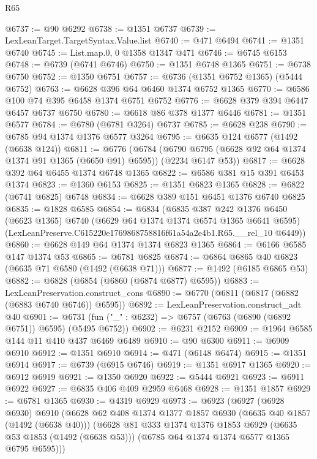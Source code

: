 \begin{lexlean}{R65}
\begin{coremodule}
@6737 := @90 @6292
@6738 := @1351 @6737
@6739 := LexLeanTarget.TargetSyntax.Value.list
@6740 := @471 @6494
@6741 := @1351 @6740
@6745 := List.map.{0, 0} @1358 @1347 @471
@6746 := @6745 @6153
@6748 := @6739 (@6741 @6746)
@6750 := @1351 @6748 @1365
@6751 := @6738 @6750
@6752 := @1350 @6751
@6757 := @6736 (@1351 @6752 @1365) (@5444 @6752)
@6763 := @6628 @396 @64 @6460 @1374 @6752 @1365
@6770 := @6586 @100 @74 @395 @6458 @1374 @6751 @6752
@6776 := @6628 @379 @394 @6447 @6457 @6737 @6750
@6780 := @6618 @86 @378 @1377 @6446
@6781 := @1351 @6577
@6784 := @6780 (@6781 @3264) @6737
@6785 := @6628 @238
@6790 := @6785 @94 @1374 @1376 @6577 @3264
@6795 := @6635 @124 @6577 (@1492 (@6638 @124))
@6811 := @6776
    (@6784 (@6790 @6795 (@6628 @92 @64 @1374 @1374 @91 @1365 (@6650 @91) @6595)) (@2234 @6147 @53))
@6817 := @6628 @392 @64 @6455 @1374 @6748 @1365
@6822 := @6586 @381 @15 @391 @6453 @1374
@6823 := @1360 @6153
@6825 := @1351 @6823 @1365
@6828 := @6822 (@6741 @6825) @6748
@6834 := @6628 @389 @151 @6451 @1376 @6740 @6825
@6835 := @1828 @6585
@6854 := @6834
    (@6835
      @387
      @242
      @1376
      @6450
      (@6623 @1365)
      @6740
      (@6629 @64 @1374 @1374 @6574 @1365 @6641 @6595)
      (LexLeanPreserve.C615220e1769868758816f61a54a2e4b1.R65.__rel_10 @6449))
@6860 := @6628 @149 @64 @1374 @1374 @6823 @1365
@6864 := @6166 @6585 @147 @1374 @53
@6865 := @6781 @6825
@6874 := @6864 @6865 @40 @6823 (@6635 @71 @6580 (@1492 (@6638 @71)))
@6877 := @1492 (@6185 @6865 @53)
@6882 := @6828 (@6854 (@6860 (@6874 @6877) @6595))
@6883 := LexLeanPreservation.construct_cons
@6890 := @6770 (@6811 (@6817 (@6882 (@6883 @6740 @6746)) @6595))
@6892 := LexLeanPreservation.construct_adt @40
@6901 := @6731 (fun ("_" : @6232) => @6757 (@6763 (@6890 (@6892 @6751)) @6595) (@5495 @6752))
@6902 := @6231 @2152
@6909 := @1964 @6585 @144 @11 @410 @437 @6469 @6489
@6910 := @90 @6300
@6911 := @6909 @6910
@6912 := @1351 @6910
@6914 := @471 (@6148 @6474)
@6915 := @1351 @6914
@6917 := @6739 (@6915 @6746)
@6919 := @1351 @6917 @1365
@6920 := @6912 @6919
@6921 := @1350 @6920
@6922 := @5444 @6921
@6923 := @6911 @6922
@6927 := @6835 @406 @409 @2959 @6468
@6928 := @1351 @1857
@6929 := @6781 @1365
@6930 := @4319 @6929
@6973 := @6923
    (@6927
      (@6928 @6930)
      @6910
      (@6628
        @62
        @408
        @1374
        @1377
        @1857
        @6930
        (@6635 @40 @1857 (@1492 (@6638 @40)))
        (@6628
          @81
          @333
          @1374
          @1376
          @1853
          @6929
          (@6635 @53 @1853 (@1492 (@6638 @53)))
          (@6785 @64 @1374 @1374 @6577 @1365 @6795 @6595)))

\end{coremodule}
\end{lexlean}
